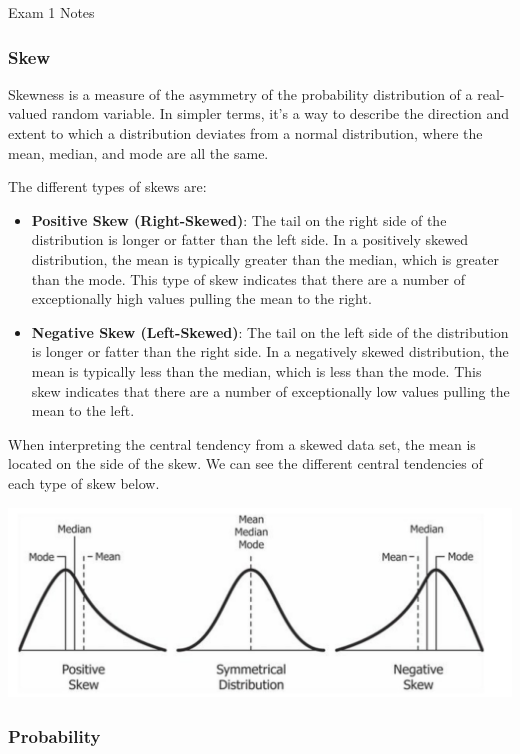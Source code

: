 \begin{examnotes}{Exam 1 Notes}
    \subsubsection*{Skew}

    Skewness is a measure of the asymmetry of the probability distribution of a real-valued random variable. In simpler terms, it's a way to describe the direction and extent to which a distribution 
    deviates from a normal distribution, where the mean, median, and mode are all the same.

    The different types of skews are:

    \begin{itemize}
        \item \textbf{Positive Skew (Right-Skewed)}: The tail on the right side of the distribution is longer or fatter than the left side. In a positively skewed distribution, the mean is typically 
        greater than the median, which is greater than the mode. This type of skew indicates that there are a number of exceptionally high values pulling the mean to the right.
        \item \textbf{Negative Skew (Left-Skewed)}: The tail on the left side of the distribution is longer or fatter than the right side. In a negatively skewed distribution, the mean is typically 
        less than the median, which is less than the mode. This skew indicates that there are a number of exceptionally low values pulling the mean to the left.
    \end{itemize}

    When interpreting the central tendency from a skewed data set, the mean is located on the side of the skew. We can see the different central tendencies of each type of skew below.

    \begin{center}
        \includegraphics[scale = 0.75]{Images/Skew.png}
    \end{center}

    \subsubsection*{Probability}


\end{examnotes}
